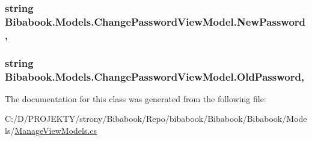 \subsubsection[{New\+Password}]{\setlength{\rightskip}{0pt plus 5cm}string Bibabook.\+Models.\+Change\+Password\+View\+Model.\+New\+Password\hspace{0.3cm}{\ttfamily [get]}, {\ttfamily [set]}}\label{class_bibabook_1_1_models_1_1_change_password_view_model_a80c1b15314d22670823a098f7cbba735}
\hypertarget{class_bibabook_1_1_models_1_1_change_password_view_model_a7c87bffbff147ae4a1cb1fec49e06df0}{}
\subsubsection[{Old\+Password}]{\setlength{\rightskip}{0pt plus 5cm}string Bibabook.\+Models.\+Change\+Password\+View\+Model.\+Old\+Password\hspace{0.3cm}{\ttfamily [get]}, {\ttfamily [set]}}\label{class_bibabook_1_1_models_1_1_change_password_view_model_a7c87bffbff147ae4a1cb1fec49e06df0}


The documentation for this class was generated from the following file\+:\begin{DoxyCompactItemize}
\item 
C\+:/\+D/\+P\+R\+O\+J\+E\+K\+T\+Y/strony/\+Bibabook/\+Repo/bibabook/\+Bibabook/\+Bibabook/\+Models/\hyperlink{_manage_view_models_8cs}{Manage\+View\+Models.\+cs}\end{DoxyCompactItemize}
